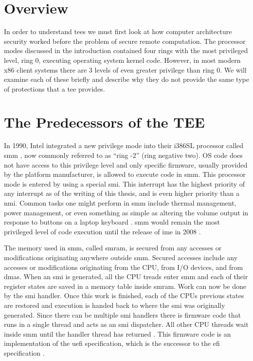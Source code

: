 \section{Overview}
In order to understand \glspl{tee} we must first look at how computer architecture security worked before the problem of secure remote computation. The processor modes discussed in the introduction contained four \glspl{ring} with the most privileged level, \gls{ring} 0, executing operating system kernel code. However, in most modern x86 client systems there are 3 levels of even greater privilege than \gls{ring} 0. We will examine each of these briefly and describe why they do not provide the same type of protections that a \gls{tee} provides.

\section{The Predecessors of the TEE}

In 1990, Intel integrated a new privilege mode into their i386SL processor called \gls{smm} \cite{zimmer2005hardened}, now commonly referred to as ``\gls{ring} -2'' (\gls{ring} negative two).  OS code does not have access to this privilege level and only specific firmware, usually provided by the platform manufacturer, is allowed to execute code in \gls{smm}. This processor mode is entered by using a special \gls{smi}. This interrupt has the highest priority of any interrupt as of the writing of this thesis, and is even higher priority than a \gls{nmi}. Common tasks one might perform in \gls{smm} include thermal management, power management, or even something as simple as altering the volume output in response to buttons on a laptop keyboard \cite{yao2009system}. \gls{smm} would remain the most privileged level of code execution until the release of \gls{ime} in 2008 \cite{eldar2008configuring}.

The memory used in \gls{smm}, called \gls{smram}, is secured from any accesses or modifications originating anywhere outside \gls{smm}. Secured accesses include any accesses or modifications originating from the CPU, from I/O devices, and from \glspl{dma}. When an \gls{smi} is generated, all the CPU treads enter \gls{smm} and each of their register states are saved in a memory table inside \gls{smram}. Work can now be done by the \gls{smi} handler. Once this work is finished, each of the CPUs previous states are restored and execution is handed back to where the \gls{smi} was originally generated. Since there can be multiple \gls{smi} handlers there is firmware code that runs in a single thread and acts as an \gls{smi} dispatcher. All other CPU threads wait inside \gls{smm} until the handler thread has returned \cite{delgado2013}. This firmware code is an implementation of the \gls{uefi} specification, which is the successor to the \gls{efi} specification \cite{beyondBIOS}.


